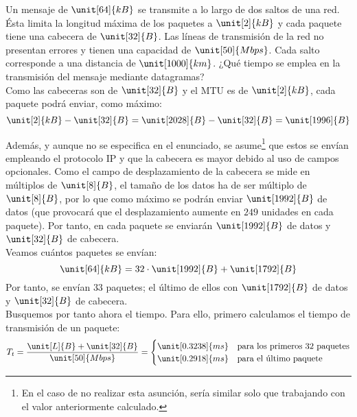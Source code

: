 \begin{ejercicio}
    Un mensaje de $\unit[64]{kB}$ se transmite a lo largo de dos saltos de una red. Ésta limita la longitud máxima de los paquetes a $\unit[2]{kB}$ y cada paquete tiene una cabecera de $\unit[32]{B}$. Las líneas de transmisión de la red no presentan errores y tienen una capacidad de $\unit[50]{Mbps}$. Cada salto corresponde a una distancia de $\unit[1000]{km}$. ¿Qué tiempo se emplea en la transmisión del mensaje mediante datagramas?\\

    Como las cabeceras son de $\unit[32]{B}$ y el \acrshort{MTU} es de $\unit[2]{kB}$, cada paquete podrá enviar, como máximo:
    \begin{equation*}
        \unit[2]{kB} - \unit[32]{B} = \unit[2028]{B} - \unit[32]{B} = \unit[1996]{B}
    \end{equation*}

    Además, y aunque no se especifica en el enunciado, se asume\footnote{En el caso de no realizar esta asunción, sería similar solo que trabajando con el valor anteriormente calculado.} que estos se envían empleando el protocolo \acrshort{IP} y que la cabecera es mayor debido al uso de campos opcionales. Como el campo de desplazamiento de la cabecera se mide en múltiplos de $\unit[8]{B}$, el tamaño de los datos ha de ser múltiplo de $\unit[8]{B}$, por lo que como máximo se podrán enviar $\unit[1992]{B}$ de datos (que provocará que el desplazamiento aumente en $249$ unidades en cada paquete). Por tanto, en cada paquete se enviarán $\unit[1992]{B}$ de datos y $\unit[32]{B}$ de cabecera.\\

    Veamos cuántos paquetes se envían:
    \begin{equation*}
        \unit[64]{kB} = 32\cdot \unit[1992]{B} + \unit[1792]{B}
    \end{equation*}
    Por tanto, se envían $33$ paquetes; el último de ellos con $\unit[1792]{B}$ de datos y $\unit[32]{B}$ de cabecera.\\

    Busquemos por tanto ahora el tiempo. Para ello, primero calculamos el tiempo de transmisión de un paquete:
    \begin{equation*}
        T_t = \frac{\unit[L]{B} + \unit[32]{B}}{\unit[50]{Mbps}} = \begin{cases}
            \unit[0.3238]{ms} & \text{para los primeros $32$ paquetes} \\
            \unit[0.2918]{ms} & \text{para el último paquete}
        \end{cases}
    \end{equation*}


\end{ejercicio}
